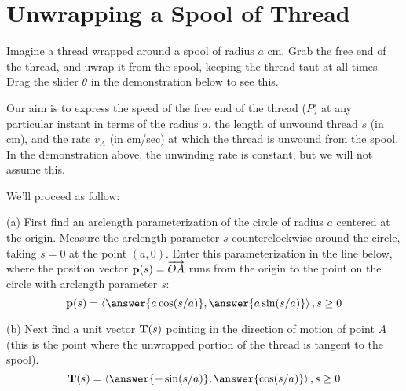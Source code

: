 \documentclass{ximera}
\begin{document}
\begin{question}

\end{question}



\section{Unwrapping a Spool of Thread}

\begin{question}  \label{Qgdghubhgfdg}

Imagine a thread wrapped around a spool of radius $a$ cm. Grab the free end of the thread, and uwrap it from the spool, keeping the thread taut at all times. Drag the slider $\theta$ in the demonstration below to see this.

 
\begin{onlineOnly}
    \begin{center}
\end{center}
\end{onlineOnly}


Our aim is to express the speed of the free end of the thread ($P$) at any particular instant in terms of the radius $a$, the length of unwound thread $s$ (in cm), and the rate $v_A$ (in cm/sec) at which the thread is unwound from the spool. In the demonstration above, the unwinding rate is constant, but we will not assume this. 

We'll proceed as follow:

(a) First find an arclength parameterization of the circle of radius $a$ centered at the origin. Measure the arclength parameter $s$ counterclockwise around the circle, taking $s=0$ at the point $(a,0)$. Enter this parameterization in the line below, where the position vector ${\bf p}(s) = \overrightarrow{OA}$ runs from the origin to the point on the circle with arclength parameter $s$:
\[
    {\bf p}(s) = \langle \answer{a \cos (s/a)} , \answer{a \sin (s/a)}  \rangle \, , s\geq 0 
\]

(b) Next find a unit vector ${\bf T}(s)$ pointing in the direction of motion of point $A$ (this is the point where the unwrapped portion of the thread is tangent to the spool). 
\[
    {\bf T}(s) = \langle \answer{- \sin (s/a)} , \answer{\cos (s/a)}  \rangle \, , s\geq 0
\]


\end{question}
\end{document}
